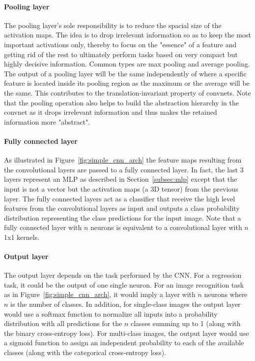 \documentclass[12pt,a4paper]{article}
\begin{document}
\paragraph{Pooling layer            } The pooling layer's sole responsibility is to reduce the spacial size of the activation maps. The idea is to drop irrelevant information so as to keep the most important activations only, thereby to focus on the "essence" of a feature and getting rid of the rest to ultimately perform tasks based on very compact but highly decisive information. Common types are max pooling and average pooling. The output of a pooling layer will be the same independently of where a specific feature is located inside its pooling region as the maximum or the average will be the same. This contributes to the translation-invariant property of convnets. Note that the pooling operation also helps to build the abstraction hierarchy in the convnet as it drops irrelevant information and thus makes the retained information more "abstract". 

\paragraph{Fully connected layer    } As illustrated in Figure~\ref{fig:simple_cnn_arch} the feature maps resulting from the convolutional layers are passed to a fully connected layer. In fact, the last 3 layers represent an MLP as described in Section~\ref{subsec:mlp} except that the input is not a vector but the activation maps (a 3D tensor) from the previous layer. The fully connected layers act as a classifier that receive the high level features from the convolutional layers as input and outputs a class probability distribution representing the class predictions for the input image. Note that a fully connected layer with $n$ neurons is equivalent to a convolutional layer with $n$ 1x1 kernels.

\paragraph{Output layer} 
The output layer depends on the task performed by the CNN. For a regression task, it could be the output of one single neuron. For an image recognition task as in Figure~\ref{fig:simple_cnn_arch}, it would imply a layer with $n$ neurons where $n$ is the number of classes. In addition, for single-class images the output layer would use a softmax function to normalize all inputs into a probability distribution with all predictions for the $n$ classes summing up to 1 (along with the binary cross-entropy loss).  For multi-class images, the output layer would use a sigmoid function to assign an independent probability to each of the available classes (along with the categorical cross-entropy loss).
\end{document}
